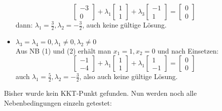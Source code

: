 \documentclass[a4paper, 12pt]{report}
\begin{document}
\begin{itemize}
  $$\begin{bmatrix}-3\\0\end{bmatrix} + \lambda_1 \begin{bmatrix}1\\1\end{bmatrix} + \lambda_3 \begin{bmatrix}-1\\1\end{bmatrix} = \begin{bmatrix}0\\0\end{bmatrix}$$
  dann: $\lambda_1 = \frac{3}{2}, \lambda_2 = -\frac{3}{2}$, auch keine gültige Lösung.

  \item $\lambda_3 = \lambda_4 = 0, \lambda_1 \neq 0, \lambda_2 \neq 0$\\
  Aus NB (1) und (2) erhält man $x_1 = 1, x_2 = 0$ und nach Einsetzen:
  $$\begin{bmatrix}-1\\-4\end{bmatrix} + \lambda_1 \begin{bmatrix}1\\1\end{bmatrix} + \lambda_1 \begin{bmatrix}1\\-1\end{bmatrix} = \begin{bmatrix}0\\0\end{bmatrix}$$
  auch $\lambda_1 = \frac{5}{2}, \lambda_2 = -\frac{3}{2}$, also auch keine gültige Lösung.
\end{itemize}

Bisher wurde kein KKT-Punkt gefunden. Nun werden noch alle Nebenbedingungen einzeln getestet:
\end{document}
